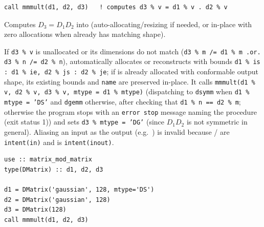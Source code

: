 
\lstset{language=[95]Fortran}
\begin{lstlisting}
call mmmult(d1, d2, d3)   ! computes d3 % v = d1 % v . d2 % v
\end{lstlisting}

Computes $D_3 = D_1 D_2$ into  (auto-allocating/resizing  if needed, or in-place with zero allocations when  already has matching shape).

If \texttt{d3 \% v} is unallocated or its dimensions do not match (\texttt{d3 \% m /= d1 \% m .or. d3 \% n /= d2 \% n}),  automatically allocates or reconstructs  with bounds \texttt{d1 \% is : d1 \% ie, d2 \% js : d2 \% je}; if  is already allocated with conformable output shape, its existing bounds and \texttt{name} are preserved in-place. It calls \texttt{mmmult(d1 \% v, d2 \% v, d3 \% v, mtype = d1 \% mtype)} (dispatching to \texttt{dsymm} when \texttt{d1 \% mtype = 'DS'} and \texttt{dgemm} otherwise, after checking that \texttt{d1 \% n == d2 \% m}; otherwise the program stops with an \texttt{error stop} message naming the procedure (exit status 1)) and sets \texttt{d3 \% mtype = 'DG'} (since $D_1 D_2$ is not symmetric in general). Aliasing an input as the output (e.g.\ ) is invalid because / are \texttt{intent(in)} and  is \texttt{intent(inout)}.

\begin{description}[leftmargin=2.2cm, style=nextline]
\end{description}

\lstset{language=[95]Fortran}
\begin{lstlisting}
use :: matrix_mod_matrix
type(DMatrix) :: d1, d2, d3

d1 = DMatrix('gaussian', 128, mtype='DS')
d2 = DMatrix('gaussian', 128)
d3 = DMatrix(128)
call mmmult(d1, d2, d3)
\end{lstlisting}
